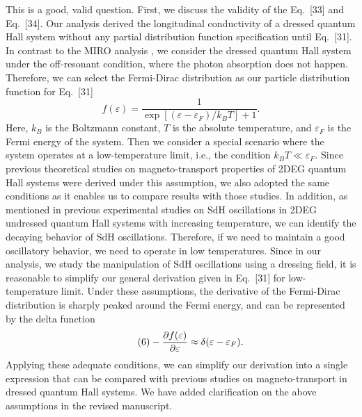 \documentclass{article}
\begin{document}
This is a good, valid question. First, we discuss the validity of the Eq.~[33] and Eq.~[34]. Our analysis derived the longitudinal conductivity of a dressed quantum Hall system without any partial distribution function specification until Eq.~[31].
In contrast to the MIRO analysis \cite{dmitriev03,dmitriev05,dmitriev09}, we consider the dressed quantum Hall system under the off-resonant condition, where the photon absorption does not happen. Therefore, we can select the Fermi-Dirac distribution as our particle distribution function for Eq.~[31]
\begin{equation} \tag{5}
  f(\varepsilon) = \frac{1}{\exp[(\varepsilon - \varepsilon_F)/k_B T]+1}.
\end{equation}
Here, $k_B$ is the Boltzmann constant, $T$ is the absolute temperature, and $\varepsilon_F$ is the Fermi energy of the system.
Then we consider a special scenario where the system operates at a low-temperature limit, i.e., the condition $k_BT \ll \varepsilon_F$.
Since previous theoretical studies \cite{wackerl20,dini16,endo09} on magneto-transport properties of 2DEG quantum Hall systems were derived under this assumption, we also adopted the same conditions as it enables us to compare results with those studies.
In addition, as mentioned in previous experimental studies on SdH oscillations \cite{zudov03,mani02,arapov02} in 2DEG undressed quantum Hall systems with increasing temperature, we can identify the decaying behavior of SdH oscillations.
Therefore, if we need to maintain a good oscillatory behavior, we need to operate in low temperatures.
Since in our analysis, we study the manipulation of SdH oscillations using a dressing field, it is reasonable to simplify our general derivation given in  Eq.~[31] for low-temperature limit. Under these assumptions, the derivative of the Fermi-Dirac distribution is sharply peaked around the Fermi energy, and  can be represented by the delta function \cite{endo09}
\begin{equation} \tag{6}
  - \pdv{f(\varepsilon)}{\varepsilon} \approx \delta(\varepsilon - \varepsilon_F).
\end{equation}
Applying these adequate conditions, we can simplify our derivation into a single expression that can be compared with previous studies \cite{wackerl20,dini16,endo09} on
magneto-transport in dressed quantum Hall systems. We have added clarification on the above assumptions in the revised manuscript.
\end{document}
